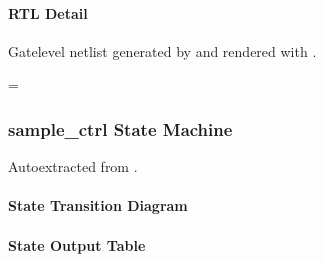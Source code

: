 \documentclass[letterpaper,10pt,english]{sphinxmanual}
\begin{document}
\paragraph{RTL Detail}
\label{\detokenize{modules/sample_ctrl/block:rtl-detail}}
\sphinxAtStartPar
Gate\sphinxhyphen{}level netlist generated by  and rendered with .

\begin{landscape}
\makeatletter
\spx@image@maxheight=\dimexpr{}\baselineskip\relax
\makeatother


\end{landscape}

\sphinxstepscope


\subsubsection{sample\_ctrl State Machine}
\label{\detokenize{modules/sample_ctrl/fsm:sample-ctrl-state-machine}}\label{\detokenize{modules/sample_ctrl/fsm::doc}}
\sphinxAtStartPar
Auto\sphinxhyphen{}extracted from .


\paragraph{State Transition Diagram}
\label{\detokenize{modules/sample_ctrl/fsm:state-transition-diagram}}


\paragraph{State Output Table}
\label{\detokenize{modules/sample_ctrl/fsm:state-output-table}}
\end{document}
